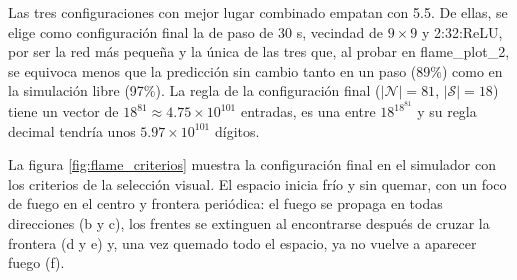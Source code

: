 	Las tres configuraciones con mejor lugar combinado empatan con 5.5. De ellas, se elige como configuración final la de paso de 30 s, vecindad de $9 \times 9$ y 2:32:ReLU, por ser la red más pequeña y la única de las tres que, al probar en flame\_plot\_2, se equivoca menos que la predicción sin cambio tanto en un paso (89\%) como en la simulación libre (97\%). La regla de la configuración final ($|\mathcal{N}| = 81$, $|\mathcal{S}| = 18$) tiene un vector de $18^{81} \approx 4.75 \times 10^{101}$ entradas, es una entre $18^{18^{81}}$ y su regla decimal tendría unos $5.97 \times 10^{101}$ dígitos.

	La figura \ref{fig:flame_criterios} muestra la configuración final en el simulador con los criterios de la selección visual. El espacio inicia frío y sin quemar, con un foco de fuego en el centro y frontera periódica: el fuego se propaga en todas direcciones (b y c), los frentes se extinguen al encontrarse después de cruzar la frontera (d y e) y, una vez quemado todo el espacio, ya no vuelve a aparecer fuego (f).

	\newcommand{\estadoflame}[2][black]{\fcolorbox{gray}{flame#2}{\makebox[1.1em]{\textcolor{#1}{#2}}}}
	\newcommand{\leyendaflame}{%
		\par\medskip
		{\footnotesize\setlength{\fboxsep}{1pt}%
		Temperatura: \estadoflame{0}\estadoflame{1}\estadoflame{2}\estadoflame{3}\estadoflame{4}\estadoflame{5}%
		\estadoflame{6}\estadoflame{7}\estadoflame{8}\estadoflame{9}\estadoflame[white]{10}\estadoflame[white]{11}%
		\quad Quemado: \estadoflame[white]{12}\estadoflame[white]{13}\estadoflame[white]{14}\estadoflame{15}%
		\estadoflame{16}\estadoflame{17}\par}}

